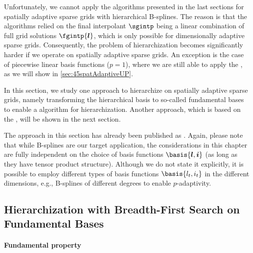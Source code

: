 \label{sec:44spatAdaptiveBFS}

Unfortunately, we cannot apply the algorithms presented in the last
sections for spatially adaptive sparse grids with
hierarchical B-splines.
The reason is that the algorithms relied on the final interpolant $\sgintp$
being a linear combination of full grid solutions $\fgintp{\*l}$,
which is only possible for dimensionally adaptive sparse grids.
Consequently, the problem of hierarchization becomes significantly
harder if we operate on spatially adaptive sparse grids.
An exception is the case of piecewise linear basis functions ($p = 1$),
where we are still able to apply the \up,
as we will show in \cref{sec:45spatAdaptiveUP}.

In this section, we study one approach to hierarchize on
spatially adaptive sparse grids,
namely transforming the hierarchical basis to so-called fundamental bases
to enable a \bfs algorithm for hierarchization.
Another approach, which is based on the \up, will be shown in the next section.

The approach in this section has already been published as
\cite{Valentin18Fundamental}.
Again, please note that while B-splines are our target application,
the considerations in this chapter are fully independent on the choice of
basis functions $\basis{\*l,\*i}$ 
(as long as they have tensor product structure).
Although we do not state it explicitly, it is possible to employ
different types of basis functions $\basis{l_t,i_t}$ in the different
dimensions, e.g., B-splines of different degrees to enable $p$-adaptivity.



\subsection{Hierarchization with Breadth-First Search on Fundamental Bases}
\label{sec:441BFSFundamentalBases}

\paragraph{Fundamental property}

